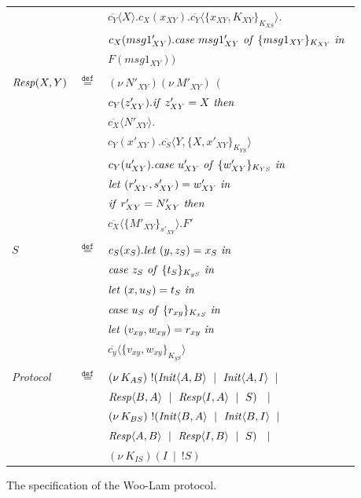 \documentclass[10pt,a4paper,final,oneside,fleqn]{book}
\newcommand*{\eqdef}{\mathbin{\mathop{=}\limits^{\texttt{def}}}}
\begin{document}
\begin{figure}[!tbp]
\begin{center}
\begin{tabular}{|lll|}
&&$\overline{c_{Y}}\langle X\rangle.c_{X}(x_{XY}).\overline{c_{Y}}\langle\{x_{XY},K_{XY}\}_{K_{XS}}\rangle.$\\
&&$c_{X}(msg1'_{XY}).\mbox{{\itshape case\/} }msg1'_{XY}\mbox{ {\itshape of\/} }\{msg1_{XY}\}_{K_{XY}}\mbox{ {\itshape in\/} }$\\
&&$F(msg1_{XY}))$\\&&\\
$\mbox{{\itshape Resp\/}}(X,Y)$&$\eqdef$&$(\nu~\!N'_{XY})(\nu~\!M'_{XY})~~($\\
&&$c_{Y}(z'_{XY}).\mbox{{\itshape if\/} }z'_{XY}=X\mbox{ {\itshape then\/} }$\\
&&$\overline{c_{X}}\langle N'_{XY}\rangle.$\\
&&$c_{Y}(x'_{XY}).\overline{c_{S}}\langle Y,\{X,x'_{XY}\}_{K_{YS}}\rangle$\\
&&$c_{Y}(u'_{XY}).\mbox{{\itshape case\/} }u'_{XY}\mbox{ {\itshape of\/} }\{w'_{XY}\}_{K_{YS}}\mbox{ {\itshape in\/}}$\\
&&$\mbox{{\itshape let\/} }(r'_{XY},s'_{XY})=w'_{XY}\mbox{ {\itshape in\/}}$\\
&&$\mbox{{\itshape if\/} }r'_{XY}=N'_{XY}\mbox{ {\itshape then\/} }$\\
&&$\overline{c_{X}}\langle\{M'_{XY}\}_{s'_{XY}}\rangle.F'$\\&&\\
$S$&$\eqdef$&$c_{S}(x_{S}).\mbox{{\itshape let\/} }(y,z_{S})=x_{S}\mbox{ {\itshape in\/}}$\\
&&$\mbox{{\itshape case\/} }z_{S}\mbox{ {\itshape of\/} }\{t_{S}\}_{K_{yS}}\mbox{ {\itshape in\/}}$\\&&$\mbox{{\itshape let\/} }(x,u_S)=t_{S}\mbox{ {\itshape in\/}}$\\
&&$\mbox{{\itshape case\/} }u_{S}\mbox{ {\itshape of\/} }\{r_{xy}\}_{K_{xS}}\mbox{ {\itshape in\/}}$\\
&&$\mbox{{\itshape let\/} }(v_{xy},w_{xy})=r_{xy}\mbox{ {\itshape in\/}}$\\
&&$\overline{c_{y}}\langle\{v_{xy},w_{xy}\}_{K_{yS}}\rangle$\\&&\\
{\itshape Protocol\/}&$\eqdef$&$(\nu~\!K_{AS})~!(\mbox{{\itshape Init\/}}\langle A,B\rangle~\mid~\mbox{{\itshape Init\/}}\langle A,I\rangle~\mid$\\
&&\hspace{13mm}$\mbox{{\itshape Resp\/}}\langle B,A\rangle~\mid~\mbox{{\itshape Resp\/}}\langle I,A\rangle~\mid~S)~~\mid$\\
&&$(\nu~\!K_{BS})~!(\mbox{{\itshape Init\/}}\langle B,A\rangle~\mid~\mbox{{\itshape Init\/}}\langle B,I\rangle~\mid$\\
&&\hspace{13mm}$\mbox{{\itshape Resp\/}}\langle A,B\rangle~\mid~\mbox{{\itshape Resp\/}}\langle I,B\rangle~\mid~S)~~\mid$\\
&&$(\nu~\!K_{IS})(I~\mid~!S)$\\
\hline
\end{tabular}
\end{center}
\caption{The specification of the Woo-Lam protocol.\label{woo}}
\end{figure}
\end{document}
